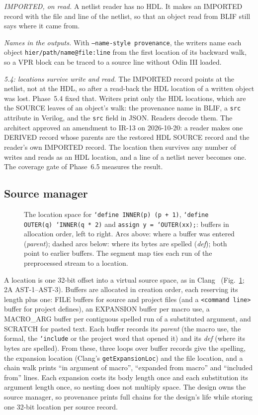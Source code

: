 \documentclass[conference]{IEEEtran}
\newcommand{\code}[1]{\texttt{#1}}
\begin{document}
\emph{IMPORTED, on read.} A netlist reader has no HDL. It makes an IMPORTED record with the
file and line of the netlist, so that an object read from BLIF still says where it came from.

\emph{Names in the outputs.} With \code{--name-style provenance}, the writers name each object
\code{hier/path/name@file:line} from the first location of its backward walk, so a VPR block can
be traced to a source line without Odin III loaded.

\emph{5.4: locations survive write and read.} The IMPORTED record points at the netlist, not
at the HDL, so after a read-back the HDL location of a written object was lost. Phase~5.4 fixed
that. Writers print only the HDL locations, which are the SOURCE leaves of an object's walk:
the provenance name in BLIF, a \code{src} attribute in Verilog, and the \code{src} field in
JSON. Readers decode them. The architect approved an amendment to IR-13 on 2026-10-20: a reader
makes one DERIVED record whose parents are the restored HDL SOURCE record and the reader's own
IMPORTED record. The location then survives any number of writes and reads as an HDL location,
and a line of a netlist never becomes one. The coverage gate of Phase~6.5 measures the result.

\subsection{Source manager}

\begin{figure}[t]
\centering
\odinfit{\columnwidth}{}
\caption{The location space for \code{`define INNER(p) (p + 1)},
\code{`define OUTER(q) `INNER(q * 2)} and \code{assign y = `OUTER(xx);}: buffers in allocation
order, left to right. Arcs above: where a buffer was entered (\emph{parent}); dashed arcs below:
where its bytes are spelled (\emph{def}); both point to earlier buffers. The segment map ties
each run of the preprocessed stream to a location.}
\label{fig:srcman}
\end{figure}

A location is one 32-bit offset into a virtual source space, as in Clang~
(Fig.~\ref{fig:srcman}; 2A AST-1--AST-3). Buffers are allocated in creation order, each
reserving its length plus one: FILE buffers for source and project files (and a
\code{<command line>} buffer for project defines), an EXPANSION buffer per macro use, a
MACRO\_ARG buffer per contiguous spelled run of a substituted argument, and SCRATCH for pasted
text. Each buffer records its \emph{parent} (the macro use, the formal, the
\code{`include} or the project word that opened it) and its \emph{def} (where its bytes are
spelled). From these, three loops over buffer records give the spelling, the expansion location
(Clang's \code{getExpansionLoc}) and the file location, and a chain walk prints
``in argument of macro'', ``expanded from macro'' and ``included from'' lines. Each expansion
costs its body length once and each substitution its argument length once, so nesting does not
multiply space. The design owns the source manager, so provenance prints full chains for the
design's life while storing one 32-bit location per source record.
\end{document}
